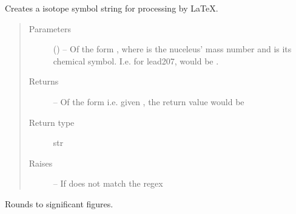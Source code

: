 \documentclass[letterpaper,10pt,english]{sphinxmanual}
\begin{document}

\begin{fulllineitems}
\label{\detokenize{references/misc:nmrespy._misc.latex_nucleus}}
\sphinxAtStartPar
Creates a isotope symbol string for processing by LaTeX.
\begin{quote}\begin{description}
\item[{Parameters}] \leavevmode
\sphinxAtStartPar
{} () – Of the form , where  is the nuceleus’
mass number and  is its chemical symbol. I.e. for
lead\sphinxhyphen{}207,  would be .

\item[{Returns}] \leavevmode
\sphinxAtStartPar
{} – Of the form  i.e. given , the
return value would be 

\item[{Return type}] \leavevmode
\sphinxAtStartPar
str

\item[{Raises}] \leavevmode
\sphinxAtStartPar
{} – If  does not match the regex 

\end{description}\end{quote}

\end{fulllineitems}


\begin{fulllineitems}
\label{\detokenize{references/misc:nmrespy._misc.significant_figures}}
\sphinxAtStartPar
Rounds  to  significant figures.

\end{fulllineitems}
\end{document}
